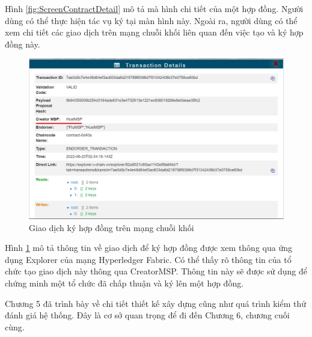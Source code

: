 \documentclass[../DoAn.tex]{subfiles}
\begin{document}
Hình \ref{fig:ScreenContractDetail} mô tả mà hình chi tiết của một hợp đồng.
Người dùng có thể thực hiện tác vụ ký tại màn hình này. Ngoài ra, người dùng có
thể xem chi tiết các giao dịch trên mạng chuỗi khối liên quan đến việc tạo và
ký hợp đồng này.

\begin{figure}[H]
    \centering
    \includegraphics[width=0.75\linewidth]{Hinhve/DoAn-ExplorerContract.png}
    \caption{Giao dịch ký hợp đồng trên mạng chuỗi khối}
    \label{fig:ExplorerContract}
\end{figure}

Hình \ref{fig:ExplorerContract} mô tả thông tin về giao dịch để ký hợp đồng
được xem thông qua ứng dụng Explorer của mạng Hyperledger Fabric. Có thể thấy
rõ thông tin của tổ chức tạo giao dịch này thông qua CreatorMSP. Thông tin này
sẽ được sử dụng để chứng minh một tổ chức đã chấp thuận và ký lên một hợp đồng. %

Chương 5 đã trình bày về chi tiết thiết kế xây dựng cũng như quá trình kiểm thử
đánh giá hệ thống. Đây là cơ sở quan trọng để đi đến Chương 6, chương cuối
cùng.
\end{document}
